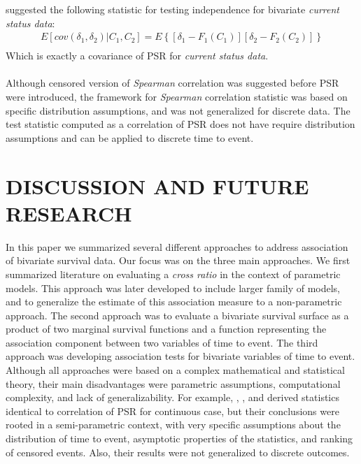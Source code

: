 \documentclass[]{article}
\begin{document}
\cite{ding2004testing} suggested the following statistic for testing independence for bivariate \emph{current status data}:
	$$
	\begin{aligned}
		 E[cov(\delta_1, \delta_2)|C_1,C_2] = E\left\{ [\delta_1 - F_1(C_1)][\delta_2 - F_2(C_2)]  \right\}\\
	\end{aligned}
	$$
Which is exactly a covariance of PSR for \emph{current status data}.\\
~\\
Although censored version of \emph{Spearman} correlation was suggested before PSR were introduced, the framework for \emph{Spearman} correlation statistic was based on specific distribution assumptions, and was not generalized for discrete data. The test statistic computed as a correlation of PSR does not have require distribution assumptions and can be applied to discrete time to event.

\section{DISCUSSION AND FUTURE RESEARCH}

In this paper we summarized several different approaches to address association of bivariate survival data. Our focus was on the three main approaches. We first summarized literature on evaluating a \emph{cross ratio} in the context of parametric models. This approach was later developed to include larger family of models, and to generalize the estimate of this association measure to a non-parametric approach. The second approach was to evaluate a bivariate survival surface as a product of two marginal survival functions and a function representing the association component between two variables of time to event. The third approach was developing association tests for bivariate variables of time to event.\\

Although all approaches were based on a complex mathematical and statistical theory, their main disadvantages were parametric assumptions, computational complexity, and lack of generalizability. For example, \cite{cuzick1982rank}, \cite{dabrowska1988kaplan}, and \cite{ding2004testing} derived statistics identical to correlation of PSR for continuous case, but their conclusions were rooted in a semi-parametric context, with very specific assumptions about the distribution of time to event, asymptotic properties of the statistics, and ranking of censored events. Also, their results were not generalized to discrete outcomes.\\
\end{document}
